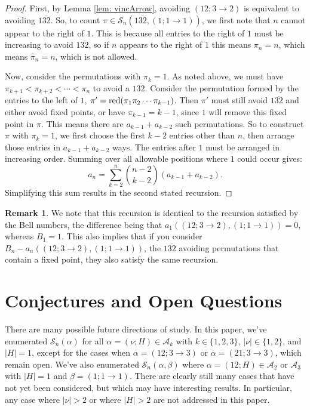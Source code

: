 \documentclass[11pt]{article}
\newcommand{\ol}[1]{\overline{#1}}
\renewcommand\S{\mathcal S}
\newcommand\A{\mathcal A}
\theoremstyle{definition}
\newtheorem{remark}[theorem]{Remark}
\begin{document}
\begin{proof}
    First, by Lemma \ref{lem: vincArrow}, avoiding $(12;3\to2)$ is equivalent to avoiding $1 \ol{32}$. So, to count $\pi \in \S_n(1 \ol{32},(1;1\to1))$, we first note that $n$ cannot appear to the right of $1$. This is because all entries to the right of $1$ must be increasing to avoid $1 \ol{32}$, so if $n$ appears to the right of $1$ this means $\pi_n = n$, which means $\hat\pi_n = n$, which is not allowed.

    Now, consider the permutations with $\pi_k = 1$. As noted above, we must have $\pi_{k+1} < \pi_{k+2} < \cdots < \pi_n$ to avoid a $1 \ol{32}$. Consider the permutation formed by the entries to the left of $1$, $\pi'  = {\rm red}(\pi_1\pi_2\cdots\pi_{k-1})$. Then $\pi'$ must still avoid $1 \ol{32}$ and either avoid fixed points, or have $\pi_{k-1} = k-1$, since $1$ will remove this fixed point in $\pi$. This means there are $a_{k-1} + a_{k-2}$ such permutations. So to construct $\pi$ with $\pi_k = 1$, we first choose the first $k-2$ entries other than $n$, then arrange those entries in $a_{k-1} + a_{k-2}$ ways. The entries after $1$ must be arranged in increasing order. Summing over all allowable positions where $1$ could occur gives:
    \[
    a_n = \sum_{k=2}^{n} \binom{n-2}{k-2}(a_{k-1} + a_{k-2}).
    \]
    Simplifying this sum results in the second stated recursion.
\end{proof}

\begin{remark}
    We note that this recursion is identical to the recursion satisfied by the Bell numbers, the difference being that $a_1((12;3\to2),(1;1\to1)) = 0$, whereas $B_1 = 1$. This also implies that if you consider $B_n - a_n((12;3\to2),(1;1\to1))$, the $1\ol{32}$ avoiding permutations that contain a fixed point, they also satisfy the same recursion.
\end{remark}


\section{Conjectures and Open Questions} \label{sec:conjs}

There are many possible future directions of study. In this paper, we've enumerated $\S_n(\alpha)$ for all $\alpha=(\nu;H)\in \A_k$ with $k\in\{1,2,3\}$, $|\nu|\in\{1,2\}$, and $|H|=1$, except for the cases when $\alpha=(12;3\to3)$ or $\alpha=(21;3\to3)$, which remain open. We've also enumerated $\S_n(\alpha,\beta)$ where $\alpha=(12;H)\in\A_2$ or $\A_3$ with $|H|=1$ and $\beta=(1;1\to1).$ There are clearly still many cases that have not yet been considered, but which may have interesting results. In particular, any case where $|\nu|>2$ or where $|H|>2$ are not addressed in this paper.  
\end{document}
